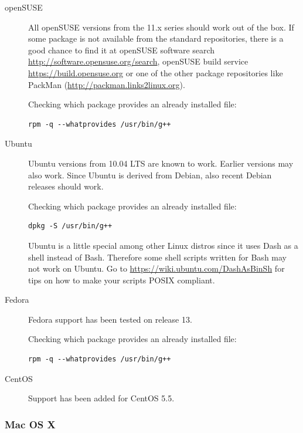 \begin{description}

\item[openSUSE] All openSUSE versions from  the 11.x series should work out of
the box.   If some  package is not  available from the  standard repositories,
there   is  a   good  chance   to  find   it  at   openSUSE   software  search
\url{http://software.opensuse.org/search},      openSUSE     build     service
\url{https://build.opensuse.org} or one of the other package repositories like
PackMan (\url{http://packman.links2linux.org}).

\noindent Checking which package provides an already installed file:
\begin{verbatim}
rpm -q --whatprovides /usr/bin/g++
\end{verbatim}

\item[Ubuntu]  Ubuntu versions  from 10.04  LTS  are known  to work.   Earlier
versions  may also  work. Since  Ubuntu is  derived from  Debian,  also recent
Debian releases should work.

\noindent Checking which package provides an already installed file:
\begin{verbatim}
dpkg -S /usr/bin/g++
\end{verbatim}

Ubuntu is a little  special among other Linux distros since it  uses Dash as a
shell instead of  Bash. Therefore some shell scripts written  for Bash may not
work on  Ubuntu. Go  to \url{https://wiki.ubuntu.com/DashAsBinSh} for  tips on
how to make your scripts POSIX compliant.

\item[Fedora] Fedora support has been tested on release 13.

\noindent Checking which package provides an already installed file:
\begin{verbatim}
rpm -q --whatprovides /usr/bin/g++
\end{verbatim}

\item[CentOS] Support has been added for CentOS 5.5.
\end{description}%

\subsubsection{Mac OS X}

